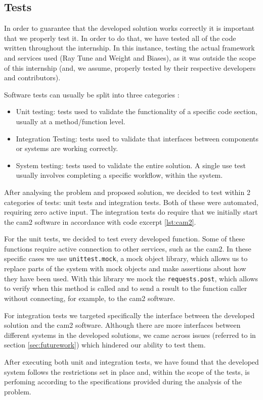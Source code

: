 
\subsection{Tests}

In order to guarantee that the developed solution works correctly it is important that we properly test it. In order to do that, we have tested all of the code written throughout the internship. In this instance, testing the actual framework and services used (Ray Tune and Weight and Biases), as it was outside the scope of this internship (and, we assume, properly tested by their respective developers and contributors).

Software tests can usually be split into three categories \parencite{Society_2014}:

\begin{itemize}
	\item Unit testing: tests used to validate the functionality of a specific code section, usually at a method/function level.
	\item Integration Testing: tests used to validate that interfaces between components or systems are working correctly.
	\item System testing: tests used to validate the entire solution. A single use test usually involves completing a specific workflow, within the system.
\end{itemize}

After analysing the problem and proposed solution, we decided to test within 2 categories of tests: unit tests and integration tests. Both of these were automated, requiring zero active input. The integration tests do require that we initially start the \acrshort{cam2} software in accordance with code excerpt \ref{lst:cam2}.

For the unit tests, we decided to test every developed function. Some of these functions require active connection to other services, such as the \acrshort{cam2}. In these specific cases we use \verb!unittest.mock!, a mock object library, which allows us to replace parts of the system with mock objects and make assertions about how they have been used. With this library we mock the \verb!requests.post!, which allows to verify when this method is called and to send a result to the function caller without connecting, for example, to the \acrshort{cam2} software.

For integration tests we targeted specifically the interface between the developed solution and the \acrshort{cam2} software. Although there are more interfaces between different systems in the developed solutions, we came across issues (referred to in section \ref{sec:futurework}) which hindered our ability to test them.

After executing both unit and integration tests, we have found that the developed system follows the restrictions set in place and, within the scope of the tests, is perfoming according to the specifications provided during the analysis of the problem.